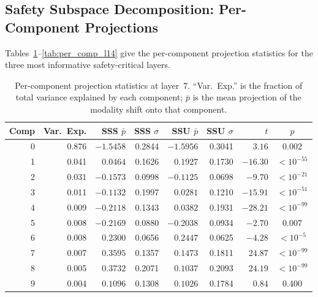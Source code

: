 \documentclass{article}
\begin{document}
\subsection{Safety Subspace Decomposition: Per-Component Projections}
\label{app:per_comp}

Tables~\ref{tab:per_comp_l7}--\ref{tab:per_comp_l14} give the per-component
projection statistics for the three most informative safety-critical layers.

\begin{table}[h]
\centering
\caption{Per-component projection statistics at layer~7.
         ``Var.\ Exp.'' is the fraction of total variance explained by each
         component; $\bar{p}$ is the mean projection of the modality shift onto
         that component.}
\label{tab:per_comp_l7}
\small
\begin{tabular}{r r rr rr r c}
\toprule
Comp & Var.\ Exp. & SSS $\bar{p}$ & SSS $\sigma$ & SSU $\bar{p}$ & SSU $\sigma$ & $t$ & $p$ \\
\midrule
0 & 0.876 & $-1.5458$ & 0.2844 & $-1.5956$ & 0.3041 &  $3.16$ & 0.002 \\
1 & 0.041 &  $0.0464$ & 0.1626 &  $0.1927$ & 0.1730 & $-16.30$ & $<10^{-55}$ \\
2 & 0.031 & $-0.1573$ & 0.0998 & $-0.1125$ & 0.0698 &  $-9.70$ & $<10^{-21}$ \\
3 & 0.011 & $-0.1132$ & 0.1997 &  $0.0281$ & 0.1210 & $-15.91$ & $<10^{-51}$ \\
4 & 0.009 & $-0.2118$ & 0.1343 &  $0.0382$ & 0.1931 & $-28.21$ & $<10^{-99}$ \\
5 & 0.008 & $-0.2169$ & 0.0880 & $-0.2038$ & 0.0934 &  $-2.70$ & 0.007 \\
6 & 0.008 &  $0.2300$ & 0.0656 &  $0.2447$ & 0.0625 &  $-4.28$ & $<10^{-5}$ \\
7 & 0.007 &  $0.3595$ & 0.1357 &  $0.1473$ & 0.1811 &  $24.87$ & $<10^{-99}$ \\
8 & 0.005 &  $0.3732$ & 0.2071 &  $0.1037$ & 0.2093 &  $24.19$ & $<10^{-99}$ \\
9 & 0.004 &  $0.1096$ & 0.1308 &  $0.1026$ & 0.1784 &   $0.84$ & 0.400 \\
\bottomrule
\end{tabular}
\end{table}
\end{document}
